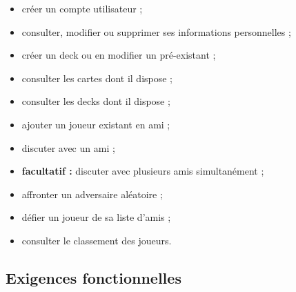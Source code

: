 \documentclass{article}
\begin{document}
	\begin{itemize}
		\item créer un compte utilisateur ;
		\item consulter, modifier ou supprimer ses informations personnelles ; 
		\item créer un deck ou en modifier un pré-existant ;
		\item consulter les cartes dont il dispose ;
		\item consulter les decks dont il dispose ;
		\item ajouter un joueur existant en ami ;
		\item discuter avec un ami ;
		\item \textbf{facultatif :} discuter avec plusieurs amis simultanément ;
		\item affronter un adversaire aléatoire ;
		\item défier un joueur de sa liste d'amis ;
		\item consulter le classement des joueurs.
	\end{itemize}

	\subsection{Exigences fonctionnelles}
\end{document}
